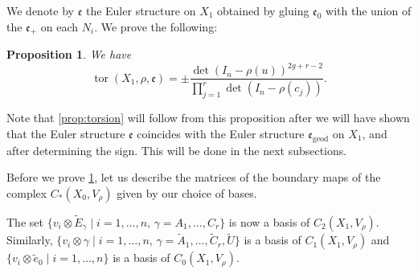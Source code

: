 \documentclass[JEP,XML,SOM,Unicode,NoFloatCountersInSection,published]{cedram}
\theoremstyle{plain}
\newtheorem{prop}[thm]{Proposition}
\theoremstyle{definition}
\theoremstyle{remark}
\newcommand{\geod}{\mathrm{geod}}
\numberwithin{equation}{section}
\DeclareMathOperator{\tor}{tor}
\begin{document}
We denote by $\mathfrak e$ the Euler structure on $X_1$ obtained by gluing $\mathfrak e_0$ with the union of the $\mathfrak e_+$ on each $N_i$. We prove the following:
\begin{prop}
\label{prop:torscomb}
We have\vspace*{-3pt}
\[
\tor(X_1, \rho, \mathfrak e) = \pm \frac{\det(I_n-\rho(u))^{2g+r-2}}{\prod_{j=1}^r \det(I_n-\rho(c_j))}.
\]
\end{prop}

Note that \cref{prop:torsion} will follow from this proposition after we will have shown that the Euler structure $\mathfrak e$ coincides with the Euler structure $\mathfrak e_\geod$ on $X_1$, and after determining the sign. This will be done in the next subsections.

Before we prove \cref{prop:torscomb}, let us describe the matrices of the boundary maps of the complex $C_*(X_0, V_\rho)$ given by our choice of bases.

The set $\{ v_i \otimes \widetilde E_\gamma \mid i = 1, \ldots, n, \, \gamma = A_1, \ldots, C_r \}$ is now a basis of $C_2(X_1, V_\rho)$. Similarly, $\{v_i \otimes \gamma \mid i = 1, \ldots, n, \, \gamma = \widetilde A_1, \ldots, \widetilde C_r, \widetilde U \}$ is a basis of $C_1(X_1, V_\rho)$ and $\{v_i \otimes \widetilde e_0 \mid i= 1, \ldots, n\}$ is a basis of $C_0(X_1, V_\rho)$.
\end{document}

